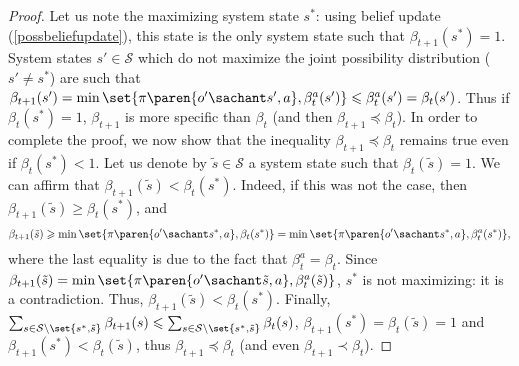 \begin{proof}
Let us note the maximizing system state $s^*$:
using belief update (\ref{possbeliefupdate}),
this state is the only system state such that $\beta_{t+1}(s^*)=1$.
System states $s' \in \mathcal{S}$ 
which do not maximize the joint possibility distribution
($s' \neq s^*$)
 are such that
$ \beta_{t+1}(s') = \min \set{ \pi \paren{ o' \sachant s',a }, \beta^a_t(s')} \leqslant \beta^a_t(s')=\beta_t(s')$.
Thus if $\beta_t(s^*) = 1$, $\beta_{t+1}$ is more specific than $\beta_t$
(and then $\beta_{t+1} \preceq \beta_t$).
In order to complete the proof, we now show that 
the inequality $\beta_{t+1} \preceq \beta_t$ remains true 
even if $\beta_t(s^*) < 1$.
Let us denote by $\tilde{s} \in \mathcal{S}$
a system state such that $\beta_t(\tilde{s}) = 1$.
We can affirm that $\beta_{t+1}(\tilde{s}) < \beta_t(s^*)$.
Indeed, if this was not the case,
then $\beta_{t+1}(\tilde{s}) \geqslant \beta_t(s^*)$,
and 
\[ \beta_{t+1}(\tilde{s}) \geqslant \min \set{ \pi \paren{o' \sachant s^*,a}, \beta_t(s^*)}
=\min \set{ \pi \paren{o' \sachant s^*,a}, \beta^a_t(s^*)},\]
where the last equality is due to the fact that $\beta^a_t=\beta_t$.
Since $\beta_{t+1}(\tilde{s}) = \min \set{ \pi \paren{o' \sachant \tilde{s},a}, \beta^a_t(\tilde{s})}$, $s^*$ is not maximizing: it is a contradiction.
Thus, $\beta_{t+1}(\tilde{s}) < \beta_t(s^*)$.
Finally, $\sum_{s \in \mathcal{S} \setminus \set{s^*,\tilde{s}}} \beta_{t+1}(s) \leqslant \sum_{s \in \mathcal{S} \setminus \set{s^*,\tilde{s}}} \beta_t(s)$, $\beta_{t+1}(s^*) = \beta_t(\tilde{s}) = 1$
and $\beta_{t+1}(s^*)< \beta_t(\tilde{s})$,
thus $\beta_{t+1} \preceq \beta_t$ (and even $\beta_{t+1} \prec \beta_t$).
\end{proof} 

